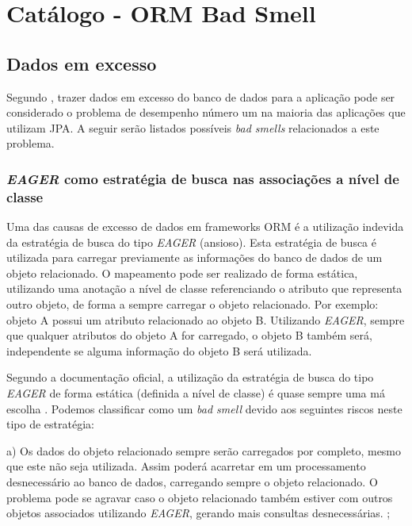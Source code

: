 \chapter{Catálogo - ORM Bad Smell}
\label{chap:badsmell}

\section{Dados em excesso}
\label{dados_excesso}
Segundo \cite{hibernate_543}, trazer dados em excesso do banco de dados para a aplicação pode ser considerado o problema de desempenho número um na maioria das aplicações que utilizam JPA. A seguir serão listados possíveis \textit{bad smells} relacionados a este problema.

\subsection{\textit{EAGER} como estratégia de busca nas associações a nível de classe}
\label{subsection:EAGER_ESTATICO}
Uma das causas de excesso de dados em frameworks ORM é a utilização indevida da estratégia de busca do tipo \textit{EAGER} (ansioso). Esta estratégia de busca é utilizada para carregar previamente as informações do banco de dados de um objeto relacionado.
O mapeamento pode ser realizado de forma estática, utilizando uma anotação a nível de classe referenciando o atributo que representa outro objeto, de forma a sempre carregar o objeto relacionado.  Por exemplo: objeto A possui um atributo relacionado ao objeto B. Utilizando \textit{EAGER}, sempre que qualquer atributos do objeto A for carregado, o objeto B também será, independente se alguma informação do objeto B será utilizada. \citep{bauer2005hibernate}


Segundo a documentação oficial, a utilização da estratégia de busca do tipo \textit{EAGER} de forma estática (definida a nível de classe) é quase sempre uma má escolha \citep{hibernate_543}. Podemos classificar como um \textit{bad smell} devido aos seguintes riscos neste tipo de estratégia:

a) Os dados do objeto relacionado sempre serão carregados por completo, mesmo que este não seja utilizada. Assim poderá acarretar em um processamento desnecessário ao banco de dados, carregando sempre o objeto relacionado. O problema pode se agravar caso o objeto relacionado também estiver com outros objetos associados utilizando \textit{EAGER}, gerando mais consultas desnecessárias. \citep{Chen:2014:Performance:Anti-patterns};


